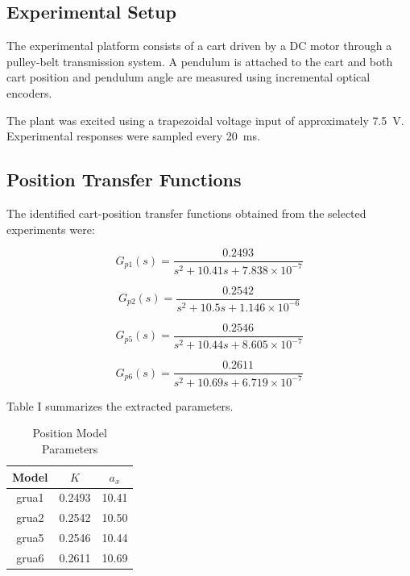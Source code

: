 \documentclass[journal,twocolumn]{IEEEtran}
\begin{document}
\subsection{Experimental Setup}

The experimental platform consists of a cart driven by a DC
motor through a pulley-belt transmission system. A pendulum
is attached to the cart and both cart position and pendulum
angle are measured using incremental optical encoders.

The plant was excited using a trapezoidal voltage input of
approximately \SI{7.5}{V}. Experimental responses were
sampled every \SI{20}{ms}.

\subsection{Position Transfer Functions}

The identified cart-position transfer functions obtained from
the selected experiments were:

\begin{equation}
G_{p1}(s)=
\frac{0.2493}{s^2+10.41s+7.838\times10^{-7}}
\end{equation}

\begin{equation}
G_{p2}(s)=
\frac{0.2542}{s^2+10.5s+1.146\times10^{-6}}
\end{equation}

\begin{equation}
G_{p5}(s)=
\frac{0.2546}{s^2+10.44s+8.605\times10^{-7}}
\end{equation}

\begin{equation}
G_{p6}(s)=
\frac{0.2611}{s^2+10.69s+6.719\times10^{-7}}
\end{equation}

Table I summarizes the extracted parameters.

\begin{table}[H]
\centering
\caption{Position Model Parameters}
\begin{tabular}{ccc}
\toprule
Model & $K$ & $a_x$ \\
\midrule
grua1 & 0.2493 & 10.41 \\
grua2 & 0.2542 & 10.50 \\
grua5 & 0.2546 & 10.44 \\
grua6 & 0.2611 & 10.69 \\
\bottomrule
\end{tabular}
\label{tab:pos}
\end{table}
\end{document}

